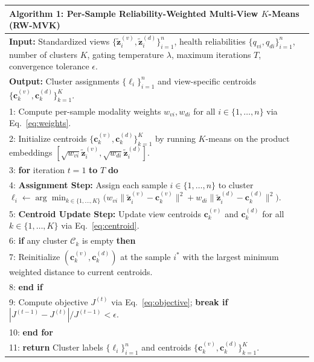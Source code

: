 \documentclass[11pt, a4paper]{article}
\begin{document}
\begin{table}[htbp]
    \centering
    \footnotesize
    \begin{tabularx}{\textwidth}{X}
        \toprule
        \textbf{Algorithm 1:} Per-Sample Reliability-Weighted Multi-View $K$-Means (RW-MVK) \\
        \midrule
        \textbf{Input:} Standardized views $\{\tilde{\mathbf{z}}_i^{(v)}, \tilde{\mathbf{z}}_i^{(d)}\}_{i=1}^n$, health reliabilities $\{q_{vi}, q_{di}\}_{i=1}^n$, number of clusters $K$, gating temperature $\lambda$, maximum iterations $T$, convergence tolerance $\epsilon$. \\
        \textbf{Output:} Cluster assignments $\{\ell_i\}_{i=1}^n$ and view-specific centroids $\{\mathbf{c}_k^{(v)}, \mathbf{c}_k^{(d)}\}_{k=1}^K$. \\[2pt]
        1: Compute per-sample modality weights $w_{vi}, w_{di}$ for all $i \in \{1,\dots,n\}$ via Eq.~\eqref{eq:weights}. \\
        2: Initialize centroids $\{\mathbf{c}_k^{(v)}, \mathbf{c}_k^{(d)}\}_{k=1}^K$ by running $K$-means on the product embeddings $[\sqrt{w_{vi}}\tilde{\mathbf{z}}_i^{(v)}, \sqrt{w_{di}}\tilde{\mathbf{z}}_i^{(d)}]$. \\
        3: \textbf{for} iteration $t = 1$ \textbf{to} $T$ \textbf{do} \\
        4: \hspace*{1.5em} \textbf{Assignment Step:} Assign each sample $i \in \{1,\dots,n\}$ to cluster $\ell_i \gets \arg\min_{k \in \{1,\dots,K\}} \big( w_{vi}\|\tilde{\mathbf{z}}_i^{(v)} - \mathbf{c}_k^{(v)}\|^2 + w_{di}\|\tilde{\mathbf{z}}_i^{(d)} - \mathbf{c}_k^{(d)}\|^2 \big)$. \\
        5: \hspace*{1.5em} \textbf{Centroid Update Step:} Update view centroids $\mathbf{c}_k^{(v)}$ and $\mathbf{c}_k^{(d)}$ for all $k \in \{1,\dots,K\}$ via Eq.~\eqref{eq:centroid}. \\
        6: \hspace*{1.5em} \textbf{if} any cluster $\mathcal{C}_k$ is empty \textbf{then} \\
        7: \hspace*{3.0em} Reinitialize $(\mathbf{c}_k^{(v)}, \mathbf{c}_k^{(d)})$ at the sample $i^*$ with the largest minimum weighted distance to current centroids. \\
        8: \hspace*{1.5em} \textbf{end if} \\
        9: \hspace*{1.5em} Compute objective $J^{(t)}$ via Eq.~\eqref{eq:objective}; \textbf{break if} $|J^{(t-1)} - J^{(t)}| / J^{(t-1)} < \epsilon$. \\
        10: \textbf{end for} \\
        11: \textbf{return} Cluster labels $\{\ell_i\}_{i=1}^n$ and centroids $\{\mathbf{c}_k^{(v)}, \mathbf{c}_k^{(d)}\}_{k=1}^K$. \\
        \bottomrule
    \end{tabularx}
\end{table}
\end{document}
